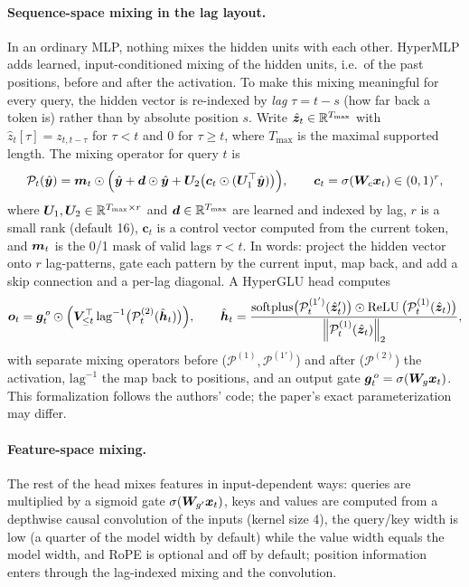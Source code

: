 \paragraph{Sequence-space mixing in the lag layout.}
In an ordinary MLP, nothing mixes the hidden units with each other. HyperMLP adds learned,
input-conditioned mixing of the hidden units, i.e.\ of the past positions, before and after the
activation. To make this mixing meaningful for every query, the hidden vector is re-indexed by
\emph{lag} $\tau=t-s$ (how far back a token is) rather than by absolute position $s$. Write
$\hat{\bm{z}}_t\in\mathbb{R}^{T_{\max}}$ with $\hat z_t[\tau]=z_{t,t-\tau}$ for $\tau<t$ and $0$ for $\tau\ge t$,
where $T_{\max}$ is the maximal supported length. The mixing operator for query $t$ is
\begin{equation}\label{eq:c04-hyper-mix}
  \mathcal{P}_t(\hat{\bm{y}})=\bm{m}_t\odot\Big(\hat{\bm{y}}+\bm{d}\odot\hat{\bm{y}}+\bm{U}_2\big(\bm{c}_t\odot(\bm{U}_1^{\top}\hat{\bm{y}})\big)\Big),
  \qquad \bm{c}_t=\sigma(\bm{W}_c\bm{x}_t)\in(0,1)^r,
\end{equation}
where $\bm{U}_1,\bm{U}_2\in\mathbb{R}^{T_{\max}\times r}$ and $\bm{d}\in\mathbb{R}^{T_{\max}}$ are learned and indexed by lag,
$r$ is a small rank (default 16), $\bm{c}_t$ is a control vector computed from the current token, and
$\bm{m}_t$ is the 0/1 mask of valid lags $\tau<t$. In words: project the hidden vector onto $r$
lag-patterns, gate each pattern by the current input, map back, and add a skip connection and a
per-lag diagonal. A HyperGLU head computes
\begin{equation}\label{eq:c04-hyper-head}
  \bm{o}_t=\bm{g}^{\,o}_t\odot\Big(\bm{V}_{\le t}^{\top}\,\mathrm{lag}^{-1}\big(\mathcal{P}^{(2)}_t(\hat{\bm{h}}_t)\big)\Big),\qquad
  \hat{\bm{h}}_t=\frac{\mathrm{softplus}\big(\mathcal{P}^{(1')}_t(\hat{\bm{z}}'_t)\big)\odot\operatorname{ReLU}\big(\mathcal{P}^{(1)}_t(\hat{\bm{z}}_t)\big)}{\left\lVert \mathcal{P}^{(1)}_t(\hat{\bm{z}}_t)\right\rVert_2},
\end{equation}
with separate mixing operators before ($\mathcal{P}^{(1)},\mathcal{P}^{(1')}$) and after
($\mathcal{P}^{(2)}$) the activation, $\mathrm{lag}^{-1}$ the map back to positions, and an output
gate $\bm{g}^{\,o}_t=\sigma(\bm{W}_g\bm{x}_t)$. This formalization follows the authors' code; the
paper's exact parameterization may differ.

\paragraph{Feature-space mixing.}
The rest of the head mixes features in input-dependent ways: queries are multiplied by a sigmoid
gate $\sigma(\bm{W}_{g'}\bm{x}_t)$, keys and values are computed from a depthwise causal convolution of
the inputs (kernel size 4), the query/key width is low (a quarter of the model width by default)
while the value width equals the model width, and RoPE is optional and off by default; position
information enters through the lag-indexed mixing and the convolution.

